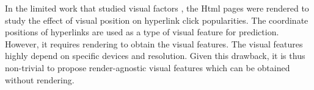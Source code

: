 In the limited work that studied visual factors \cite{dimitrov2016visual, dimitrov2017makes}, the Html pages were rendered to study the effect of visual position on hyperlink click popularities. The coordinate positions of hyperlinks are used as a type of visual feature for prediction. However, it requires rendering to obtain the visual features. The visual features highly depend on specific devices and resolution. Given this drawback, it is thus non-trivial to propose render-agnostic visual features which can be obtained without rendering.
